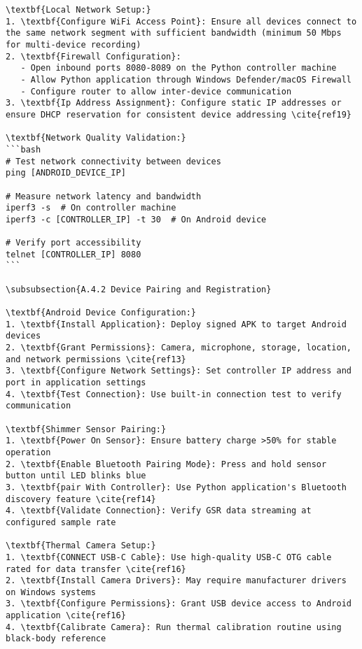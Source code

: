 \begin{verbatim}
\textbf{Local Network Setup:}
1. \textbf{Configure WiFi Access Point}: Ensure all devices connect to the same network segment with sufficient bandwidth (minimum 50 Mbps for multi-device recording)
2. \textbf{Firewall Configuration}:
   - Open inbound ports 8080-8089 on the Python controller machine
   - Allow Python application through Windows Defender/macOS Firewall
   - Configure router to allow inter-device communication
3. \textbf{Ip Address Assignment}: Configure static IP addresses or ensure DHCP reservation for consistent device addressing \cite{ref19}

\textbf{Network Quality Validation:}
```bash
# Test network connectivity between devices
ping [ANDROID_DEVICE_IP]

# Measure network latency and bandwidth
iperf3 -s  # On controller machine
iperf3 -c [CONTROLLER_IP] -t 30  # On Android device

# Verify port accessibility
telnet [CONTROLLER_IP] 8080
```

\subsubsection{A.4.2 Device Pairing and Registration}

\textbf{Android Device Configuration:}
1. \textbf{Install Application}: Deploy signed APK to target Android devices
2. \textbf{Grant Permissions}: Camera, microphone, storage, location, and network permissions \cite{ref13}
3. \textbf{Configure Network Settings}: Set controller IP address and port in application settings
4. \textbf{Test Connection}: Use built-in connection test to verify communication

\textbf{Shimmer Sensor Pairing:}
1. \textbf{Power On Sensor}: Ensure battery charge >50% for stable operation
2. \textbf{Enable Bluetooth Pairing Mode}: Press and hold sensor button until LED blinks blue
3. \textbf{pair With Controller}: Use Python application's Bluetooth discovery feature \cite{ref14}
4. \textbf{Validate Connection}: Verify GSR data streaming at configured sample rate

\textbf{Thermal Camera Setup:}
1. \textbf{CONNECT USB-C Cable}: Use high-quality USB-C OTG cable rated for data transfer \cite{ref16}
2. \textbf{Install Camera Drivers}: May require manufacturer drivers on Windows systems
3. \textbf{Configure Permissions}: Grant USB device access to Android application \cite{ref16}
4. \textbf{Calibrate Camera}: Run thermal calibration routine using black-body reference


\end{verbatim}
